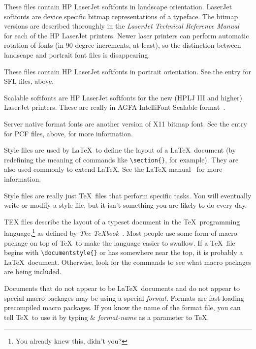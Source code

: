 \begin{iplist}{.25in}
\extitem [sfl] These files contain HP LaserJet softfonts in landscape
orientation.  LaserJet softfonts are device specific bitmap representations of
a typeface.  The bitmap versions are described thoroughly in the {\em LaserJet
Technical Reference Manual\/}~\cite{pcl5:techref} for each of the HP LaserJet
printers.  Newer laser printers can perform automatic rotation of fonts (in 90
degree increments, at least), so the distinction between landscape and portrait
font files is disappearing.

\extitem [sfp] These files contain HP LaserJet softfonts in portrait
orientation.  See the entry for SFL files, above.

\extitem [sfs] Scalable softfonts are HP LaserJet softfonts for the
new (HPLJ III and higher) LaserJet printers.  These are really in AGFA
IntelliFont Scalable format~\cite{intellifont}.

\extitem [snf] Server native format fonts are another version of X11
bitmap font.  See the entry for PCF files, above, for more information.

\extitem [sty] Style files are used by \LaTeX\ to define the layout of
a \LaTeX\ document (by redefining the meaning of commands like
\verb+\section{}+, for example).  They are also used commonly to extend
\LaTeX.  See the \LaTeX{} manual~\cite{ll:latexbook} for more information.

Style files are really just \TeX\ files that perform specific tasks.  You
will eventually write or modify a style file, but it isn't something you
are likely to do every day.

\newpage
\extitem [tex] TEX files describe the layout of a typeset document in the
\TeX\ programming language,\footnote{You already knew this, didn't you?}
as defined by {\em The \TeX{}book}~\cite{kn:texbook}.  Most
people use some form of macro package on top of \TeX\ to make the language
easier to swallow.  If a \TeX\ file begins with \verb+\documentstyle{}+ or has
\verb++ somewhere near the top, it is probably a \LaTeX\
document.  Otherwise, look for the \verb++ commands to see what macro
packages are being included.

Documents that do not appear to be \LaTeX\ documents and do not appear to
\verb|| special macro packages may be using a special {\em format}.
Formats are fast-loading precompiled macro packages.  If you know the name
of the format file, you can tell \TeX\ to use it by typing \&{\em
format-name\/} as a parameter to \TeX.


\end{iplist}
